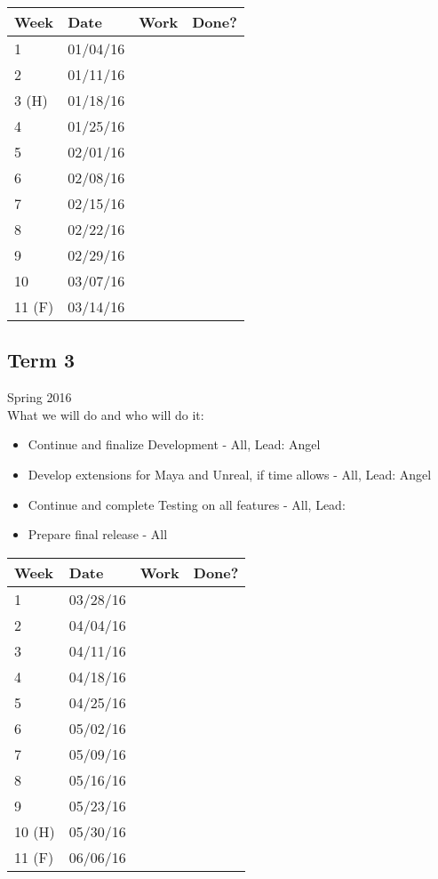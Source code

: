 \documentclass[12pt]{article}
\begin{document}
\begin{table}[H]
\centering
\begin{tabular}{|l|l|l|l|}
\hline
Week 	& Date	 		& Work	 		& 	Done?	 \\ \hline
1		& 01/04/16	 	& 		& 			 \\ \hline
2		& 01/11/16	 	& 		& 			 \\ \hline
3 (H)	& 01/18/16	 	& 		& 			 \\ \hline
4		& 01/25/16	 	& 		& 			 \\ \hline
5		& 02/01/16	 	& 		& 			 \\ \hline
6		& 02/08/16	 	& 		& 			 \\ \hline
7		& 02/15/16	 	& 		& 			 \\ \hline
8		& 02/22/16	 	& 		& 			 \\ \hline
9		& 02/29/16	 	& 		& 			 \\ \hline
10		& 03/07/16	 	& 		& 			 \\ \hline
11 (F)	& 03/14/16	 	& 		& 			 \\ \hline
\end{tabular}
\end{table}

\subsection{Term 3}
Spring 2016 \\
What we will do and who will do it:
\begin{itemize}
	\item Continue and finalize Development - All, Lead: Angel
	\item Develop extensions for Maya and Unreal, if time allows - All, Lead: Angel
	\item Continue and complete Testing on all features - All, Lead: 
	\item Prepare final release - All
\end{itemize}

\begin{table}[H]
\centering
\begin{tabular}{|l|l|l|l|}
\hline
Week 	& Date	 		& Work	 		& 	Done?	 \\ \hline
1		& 03/28/16	 	& 		& 			 \\ \hline
2		& 04/04/16	 	& 		& 			 \\ \hline
3		& 04/11/16	 	& 		& 			 \\ \hline
4		& 04/18/16	 	& 		& 			 \\ \hline
5		& 04/25/16	 	& 		& 			 \\ \hline
6		& 05/02/16	 	& 		& 			 \\ \hline
7		& 05/09/16	 	& 		& 			 \\ \hline
8		& 05/16/16	 	& 		& 			 \\ \hline
9		& 05/23/16	 	& 		& 			 \\ \hline
10 (H)	& 05/30/16	 	& 		& 			 \\ \hline
11 (F)	& 06/06/16	 	& 		& 			 \\ \hline
\end{tabular}
\end{table}
\end{document}
